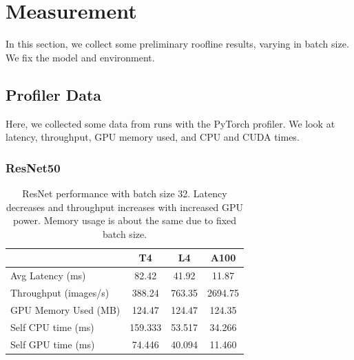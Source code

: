 \documentclass[11pt]{article}
\begin{document}
\section*{Measurement}
In this section, we collect some preliminary roofline results, varying in batch size. We fix the model and environment.

\subsection*{Profiler Data}
Here, we collected some data from runs with the PyTorch profiler. We look at latency, throughput, GPU memory used, and CPU and CUDA times.

\subsubsection*{ResNet50}
\begin{table}[h]
    \centering
    \begin{tabular}{lccc}
        \toprule
        & T4 & L4 & A100 \\
        \midrule
        Avg Latency (ms) & 82.42 & 41.92 & 11.87 \\
        Throughput (images/s) & 388.24 & 763.35 & 2694.75 \\
        GPU Memory Used (MB) & 124.47 & 124.47 & 124.35 \\
        Self CPU time (ms) & 159.333 & 53.517 & 34.266 \\
        Self GPU time (ms) & 74.446 & 40.094 & 11.460 \\
        \bottomrule
    \end{tabular}
    \caption{ResNet performance with batch size 32. Latency decreases and throughput increases with increased GPU power. Memory usage is about the same due to fixed batch size.}
    \label{tab:gpu_comparison}
\end{table}
\end{document}
